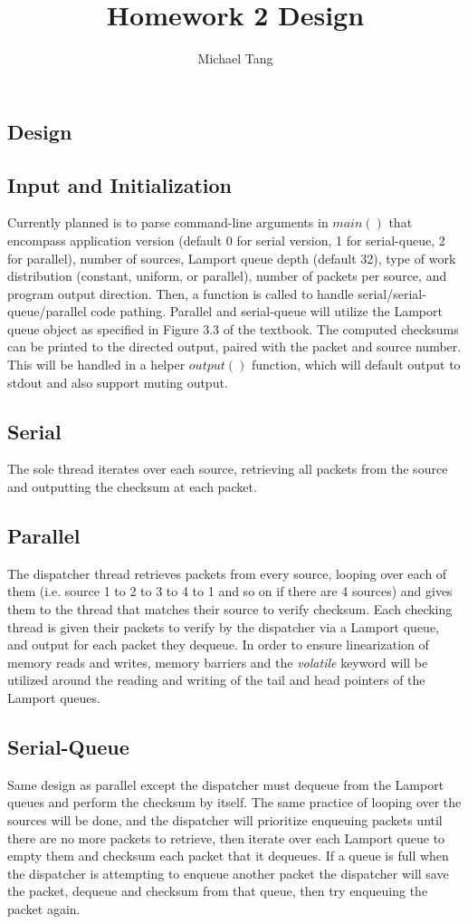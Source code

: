 \documentclass{article}
\title{Homework 2 Design}
\author{Michael Tang}
\begin{document}
\maketitle
{}
\begin{adjustwidth}{-2cm}{-2cm}

\section{Design}
\subsection{Input and Initialization}
Currently planned is to parse command-line arguments in $main()$ that encompass application version (default 0 for serial version, 1 for serial-queue, 2 for parallel), number of sources, Lamport queue depth (default 32), type of work distribution (constant, uniform, or parallel), number of packets per source, and program output direction. Then, a function is called to handle serial/serial-queue/parallel code pathing. Parallel and serial-queue will utilize the Lamport queue object as specified in Figure 3.3 of the textbook. The computed checksums can be printed to the directed output, paired with the packet and source number. This will be handled in a helper $output()$ function, which will default output to stdout and also support muting output.
\subsection{Serial}
The sole thread iterates over each source, retrieving all packets from the source and outputting the checksum at each packet.
\subsection{Parallel}
The dispatcher thread retrieves packets from every source, looping over each of them (i.e. source 1 to 2 to 3 to 4 to 1 and so on if there are 4 sources) and gives them to the thread that matches their source to verify checksum. Each checking thread is given their packets to verify by the dispatcher via a Lamport queue, and output for each packet they dequeue. In order to ensure linearization of memory reads and writes, memory barriers and the \textit{volatile} keyword will be utilized around the reading and writing of the tail and head pointers of the Lamport queues. 
\subsection{Serial-Queue}
Same design as parallel except the dispatcher must dequeue from the Lamport queues and perform the checksum by itself. The same practice of looping over the sources will be done, and the dispatcher will prioritize enqueuing packets until there are no more packets to retrieve, then iterate over each Lamport queue to empty them and checksum each packet that it dequeues. If a queue is full when the dispatcher is attempting to enqueue another packet the dispatcher will save the packet, dequeue and checksum from that queue, then try enqueuing the packet again.


\end{adjustwidth}
\end{document}
